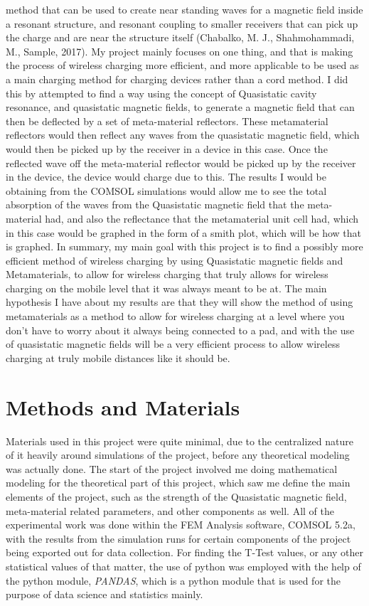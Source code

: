 \documentclass[]{article}
\begin{document}
method that can be used to create near standing waves for a magnetic field inside a resonant structure, and resonant coupling to smaller receivers that can pick up the charge and are near the structure itself (Chabalko, M. J., Shahmohammadi, M., Sample, 2017).
\linebreak
My project mainly focuses on one thing, and that is making the process of wireless charging more efficient, and more applicable to be used as a main charging method for charging devices rather than a cord method. I did this by attempted to find a way using the concept of Quasistatic cavity resonance, and quasistatic magnetic fields, to generate a magnetic field that can then be deflected by a set of meta-material reflectors. These metamaterial reflectors would then reflect any waves from the quasistatic magnetic field, which would then be picked up by the receiver in a device in this case. Once the reflected wave off the meta-material reflector would be picked up by the receiver in the device, the device would charge due to this. The results I would be obtaining from the COMSOL simulations would allow me to see the total absorption of the waves from the Quasistatic magnetic field that the meta-material had, and also the reflectance that the metamaterial unit cell had, which in this case would be graphed in the form of a smith plot, which will be how that is graphed. In summary, my main goal with this project is to find a possibly more efficient method of wireless charging by using Quasistatic magnetic fields and Metamaterials, to allow for wireless charging that truly allows for wireless charging on the mobile level that it was always meant to be at. The main hypothesis I have about my results are that they will show the method of using metamaterials as a method to allow for wireless charging at a level where you don't have to worry about it always being connected to a pad, and with the use of quasistatic magnetic fields will be a very efficient process to allow wireless charging at truly mobile distances like it should be.

\section*{Methods and Materials} 
Materials used in this project were quite minimal, due to the centralized nature of it heavily around simulations of the project, before any theoretical modeling was actually done. The start of the project involved me doing mathematical modeling for the theoretical part of this project, which saw me define the main elements of the project, such as the strength of the Quasistatic magnetic field, meta-material related parameters, and other components as well. All of the experimental work was done within the FEM Analysis software, COMSOL 5.2a, with the results from the simulation runs for certain components of the project being exported out for data collection. For finding the T-Test values, or any other statistical values of that matter, the use of python was employed with the help of the python module, \textit{PANDAS}, which is a python module that is used for the purpose of data science and statistics mainly.
\end{document}
